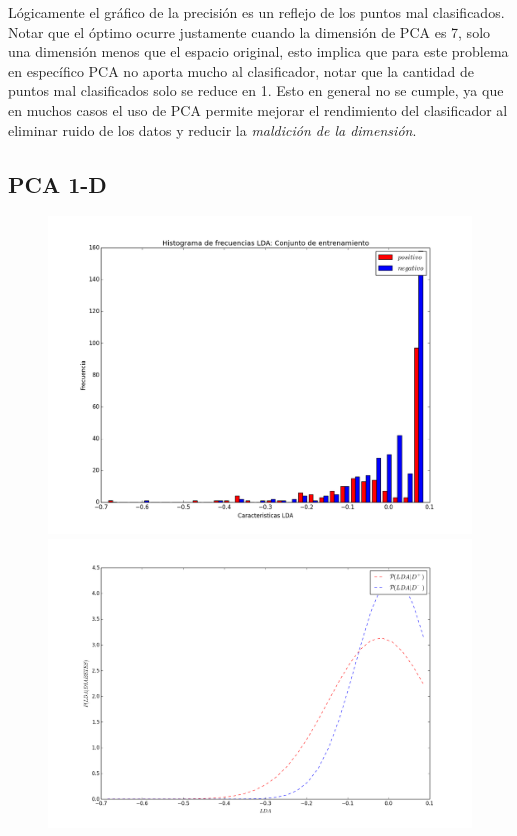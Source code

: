 \documentclass[letter, titlepage, 10pt]{article}
\begin{document}
Lógicamente el gráfico de la precisión es un reflejo de los puntos mal clasificados. Notar que el óptimo ocurre justamente cuando la dimensión de PCA es 7, solo una dimensión menos que el espacio original, esto implica que para este problema en específico PCA no aporta mucho al clasificador, notar que la cantidad de puntos mal clasificados solo se reduce en 1. Esto en general no se cumple, ya que en muchos casos el uso de PCA permite mejorar el rendimiento del clasificador al eliminar ruido de los datos y reducir la \textit{maldición de la dimensión}.

\subsection{PCA 1-D}
  \begin{figure}[H]
  \centering
    \begin{minipage}{.5\textwidth}
        \centering
        \includegraphics[width=1\linewidth]{images/Histograma_D1}
    \end{minipage}%
    \begin{minipage}{.5\textwidth}
        \centering
        \includegraphics[width=1\linewidth]{images/PDF_D1}

\end{minipage}
\end{figure}
\end{document}
